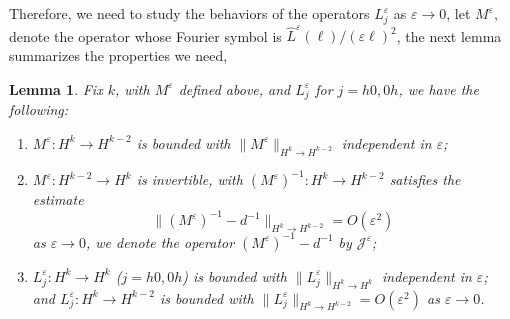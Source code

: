 \documentclass[letterpaper,11pt]{article}
\newcommand{\eps}{\varepsilon}
\numberwithin{equation}{section}
\theoremstyle{plain}
\newtheorem{lemma}[theorem]{Lemma}
\begin{document}
Therefore, we need to study the behaviors of the operators $L_{j}^{\eps}$  as $\eps \to 0$, let $M^{\eps},$ denote the operator whose Fourier symbol is $\widehat{L}^{\eps}(\ell)/(\eps\ell)^2$, 
the next lemma summarizes the properties we need, 

\begin{lemma}\label{estmult}Fix $k$, with $M^\eps$ defined above, and $L_j^{\eps}$ for $j =h0,0h$, we have the following:
\begin{enumerate}
\item $M^\eps : H^k \to H^{k-2}$ is bounded with $\|M^\eps\|_{H^k \to H^{k-2}}$ independent in $\eps$;

\item $M^\eps : H^{k-2} \to H^k$ is invertible, with $(M^\eps)^{-1} : H^k \to H^{k-2}$ satisfies the estimate \[
\|(M^\eps)^{-1} -d^{-1}\|_{H^k \to H^{k-2}} = O(\eps^2)
\] as $\eps \to 0$, we denote the operator $(M^\eps)^{-1}-d^{-1}$ by $\mathcal{J}^\eps$;

\item $L_{j}^{\eps} :H^k \to H^k$ ($j =h0,0h$) is bounded with $\|L_{j}^{\eps}\|_{H^k \to H^k}$ independent in $\eps$; and $L_j^{\eps} : H^k \to H^{k-2}$ is bounded with $\|L_{j}^{\eps}\|_{H^k \to H^{k-2}} = O(\eps^2)$ as $\eps \to 0$.

\end{enumerate}
\end{lemma}
\end{document}
